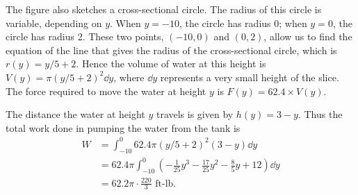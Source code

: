 \begin{example}
The figure also sketches %
a cross-sectional circle. The radius of this circle is variable, depending on $y$. When $y=-10$, the circle has radius 0; when $y=0$, the circle has radius 2. These two points, $(-10,0)$ and $(0,2)$, allow us to find the equation of the line that gives the radius of the cross-sectional circle, which is $r(y) = y/5+2$. Hence the volume of water at this height is $V(y)=\pi(y/5+2)^2\dd y$, where $\dd y$ represents a very small height of the slice. The force required to move the water at height $y$ is $F(y) = 62.4\times V(y)$.

The distance the water at height $y$ travels is given by $h(y)=3-y$. Thus the total work done in pumping the water from the tank is 
\begin{align*}
	W
	&= \int_{-10}^0 62.4\pi(y/5+2)^2(3-y)\dd y\\
	&= 62.4\pi\int_{-10}^0\left(-\frac1{25}y^3-\frac{17}{25}y^2-\frac85y+12\right)\dd y\\
	&= 62.2\pi\cdot\frac{220}{3} %
	\text{ ft-lb.}
\end{align*}
\end{example}

